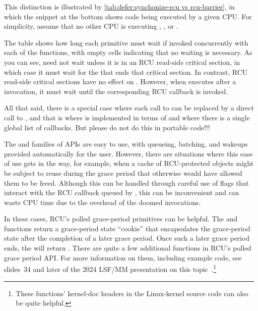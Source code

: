 {{	This distinction is illustrated by
	\cref{tab:defer:synchonize-rcu vs rcu-barrier}, in which
	the snippet at the bottom shows code being executed by a given CPU\@.
	For simplicity, assume that no other CPU is executing
	, , or
	.

	The table shows how long each primitive must wait if invoked
	concurrently with each of the 
	functions, with empty cells indicating that no
	waiting is necessary.
	As you can see,  need not wait unless
	it is in an RCU read-side critical section, in which case
	it must wait for the  that ends that
	critical section.
	In contrast, RCU read-side critical sections have no effect
	on .
	However, when  executes after a
	 invocation, it must wait until the
	corresponding RCU callback is invoked.

	All that said, there is a special case where each call to
	 can be replaced by a direct call to
	, and that is where 
	is implemented in terms of  and where there is
	a single global list of callbacks.
	But please do not do this in portable code!!!
}\QuickQuizEndE
}

The  and  families of APIs are easy
to use, with queueing, batching, and wakeups provided automatically for
the user.
However, there are situations where this ease of use gets in the way,
for example, when a cache of RCU-protected objects might be subject
to reuse during the grace period that otherwise would have allowed them
to be freed.
Although this can be handled through careful use of flags that interact
with the RCU callback queued by , this can be inconvenient
and can waste CPU time due to the overhead of the doomed 
invocations.

In these cases, RCU's polled grace-period primitives can be helpful.
The  and 
functions return a grace-period state ``cookie'' that encapsulates the
grace-period state after the completion of a later grace period.
Once such a later grace period ends, the 
will return .
There are quite a few additional functions in RCU's polled grace
period API\@.
For more information on them, including example code, see slides~34 and
later of the 2024 LSF/MM presentation on this
topic~\cite{PaulEMcKenney2024ReclamationInteractionsWithRCU}.\footnote{
	These functions' kernel-doc headers in the Linux-kernel source
	code can also be quite helpful.}

